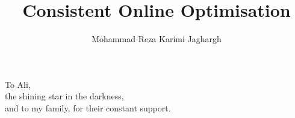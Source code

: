 \documentclass[12pt,a4paper]{amsbook}
\theoremstyle{definition}
\theoremstyle{remark}
\numberwithin{section}{chapter}
\numberwithin{equation}{chapter}
\begin{document}
\frontmatter


\setcounter{page}{0}
\clearpage\thispagestyle{empty}\mbox{}\clearpage
\title{Consistent Online Optimisation}
\author{Mohammad Reza Karimi Jaghargh}
\address{Learning and Adaptive Systems Group, Computer Science Department, ETH Z\"urich}
\maketitle

\cleardoublepage
\thispagestyle{empty}
\vspace*{13.5pc}
\begin{center}
    To Ali,\\[2pt]
    the shining star in the darkness,\\[2pt]
    and to my family, for their constant support.
\end{center}
\cleardoublepage

\setcounter{page}{5}
\tableofcontents

\mainmatter








\appendix


\backmatter



\newpage

\end{document}
